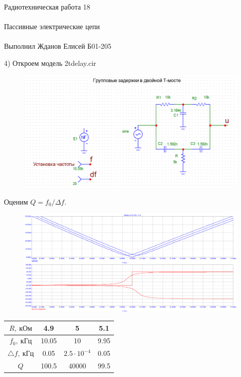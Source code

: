 \documentclass{astroedu-lab}
\begin{document}
\begin{problem}{\huge Радиотехническая работа 18\\\\Пассивные электрические цепи\\\\Выполнил Жданов Елисей Б01-205}
\newpage

4) Откроем модель 2tdelay.cir

\begin{figure}[!h]
	\centering
	\includegraphics[width=1\textwidth]{3_10.png}
	\label{fig:boiler}
\end{figure}

Оценим $Q = f_0/\Delta f$.

\begin{figure}[!h]
	\centering
	\includegraphics[width=1\textwidth]{3_11.png}
	\label{fig:boiler}
\end{figure}

\begin{center}
\begin{tabular}{|c|c|c|c|}
\hline 
$R, \: \textit{кОм}$ & 4.9 & 5 & 5.1 \\ 
\hline 
$f_0, \: \textit{кГц}$ & 10.05 & 10 & 9.95 \\ 
\hline 
$\triangle f, \: \textit{кГц}$ & 0.05 & $ 2.5 \cdot 10^{-4}$ & 0.05 \\ 
\hline 
$Q$ & 100.5 & 40000 & 99.5 \\ 
\hline 
\end{tabular}
\end{center}


\end{problem}
\end{document}
